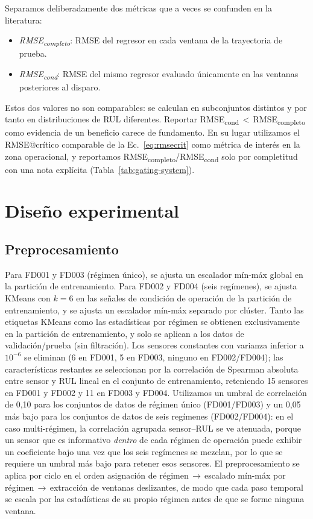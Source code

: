 \documentclass[5p,times,authoryear]{elsarticle}
\begin{document}
Separamos deliberadamente dos métricas que a veces se confunden en la literatura:
\begin{itemize}
    \item \emph{RMSE\textsubscript{completo}}: RMSE del regresor en cada ventana de la trayectoria de prueba.
    \item \emph{RMSE\textsubscript{cond}}: RMSE del mismo regresor evaluado únicamente en las ventanas posteriores al disparo.
\end{itemize}
Estos dos valores no son comparables: se calculan en subconjuntos distintos y por tanto en distribuciones de RUL diferentes. Reportar RMSE\textsubscript{cond}\,$<$\,RMSE\textsubscript{completo} como evidencia de un beneficio carece de fundamento. En su lugar utilizamos el RMSE@crítico comparable de la Ec.~\eqref{eq:rmsecrit} como métrica de interés en la zona operacional, y reportamos RMSE\textsubscript{completo}/RMSE\textsubscript{cond} solo por completitud con una nota explícita (Tabla~\ref{tab:gating-system}).

\section{Diseño experimental}\label{sec:exp}

\subsection{Preprocesamiento}\label{sec:exp-preproc}

Para FD001 y FD003 (régimen único), se ajusta un escalador mín-máx global en la partición de entrenamiento. Para FD002 y FD004 (seis regímenes), se ajusta KMeans con $k{=}6$ en las señales de condición de operación de la partición de entrenamiento, y se ajusta un escalador mín-máx separado por clúster. Tanto las etiquetas KMeans como las estadísticas por régimen se obtienen exclusivamente en la partición de entrenamiento, y solo se aplican a los datos de validación/prueba (sin filtración). Los sensores constantes con varianza inferior a $10^{-6}$ se eliminan (6 en FD001, 5 en FD003, ninguno en FD002/FD004); las características restantes se seleccionan por la correlación de Spearman absoluta entre sensor y RUL lineal en el conjunto de entrenamiento, reteniendo 15 sensores en FD001 y FD002 y 11 en FD003 y FD004. Utilizamos un umbral de correlación de 0{,}10 para los conjuntos de datos de régimen único (FD001/FD003) y un 0{,}05 más bajo para los conjuntos de datos de seis regímenes (FD002/FD004): en el caso multi-régimen, la correlación agrupada sensor--RUL se ve atenuada, porque un sensor que es informativo \emph{dentro} de cada régimen de operación puede exhibir un coeficiente bajo una vez que los seis regímenes se mezclan, por lo que se requiere un umbral más bajo para retener esos sensores. El preprocesamiento se aplica por ciclo en el orden asignación de régimen\,$\rightarrow$\,escalado mín-máx por régimen\,$\rightarrow$\,extracción de ventanas deslizantes, de modo que cada paso temporal se escala por las estadísticas de su propio régimen antes de que se forme ninguna ventana.
\end{document}
